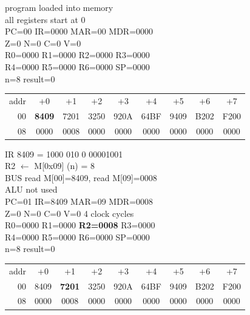 \noindent\begin{tcolorbox}[stepbox, title={Step 0 \hfill starting state}]
\textcolor{dim}{program loaded into memory}\\
\textcolor{dim}{all registers start at 0}\\
PC=00 IR=0000 MAR=00 MDR=0000\\
Z=0 N=0 C=0 V=0\\
R0=0000 R1=0000 R2=0000 R3=0000\\
R4=0000 R5=0000 R6=0000 SP=0000\\
\textcolor{dim}{n=8  result=0}\\[1pt]
{\setlength{\tabcolsep}{1.6pt}\begin{tabular}{@{}r*{8}{c}@{}}
\textcolor{dim}{addr} & \textcolor{dim}{+0} & \textcolor{dim}{+1} & \textcolor{dim}{+2} & \textcolor{dim}{+3} & \textcolor{dim}{+4} & \textcolor{dim}{+5} & \textcolor{dim}{+6} & \textcolor{dim}{+7}\\
\textcolor{dim}{00} & \cellcolor{pcc}\textbf{8409} & 7201 & 3250 & 920A & 64BF & 9409 & B202 & F200\\
\textcolor{dim}{08} & 0000 & \cellcolor{datac}0008 & \cellcolor{datac}0000 & 0000 & 0000 & 0000 & 0000 & 0000\\
\end{tabular}}
\end{tcolorbox}\hfill\begin{tcolorbox}[stepbox, title={Step 1 \hfill PC 00 \quad LD R2, n}]
\textcolor{dim}{IR} 8409 = 1000 010 0 00001001\\
R2 $\leftarrow$ M[0x09] (n) = 8\\
\textcolor{dim}{BUS} read M[00]=8409, read M[09]=0008\\
\textcolor{dim}{ALU} \textcolor{dim}{not used}\\
PC=01 IR=8409 MAR=09 MDR=0008\\
Z=0 N=0 C=0 V=0 \hfill \textcolor{dim}{4 clock cycles}\\
R0=0000 R1=0000 \textcolor{wrt}{\textbf{R2=0008}} R3=0000\\
R4=0000 R5=0000 R6=0000 SP=0000\\
\textcolor{dim}{n=8  result=0}\\[1pt]
{\setlength{\tabcolsep}{1.6pt}\begin{tabular}{@{}r*{8}{c}@{}}
\textcolor{dim}{addr} & \textcolor{dim}{+0} & \textcolor{dim}{+1} & \textcolor{dim}{+2} & \textcolor{dim}{+3} & \textcolor{dim}{+4} & \textcolor{dim}{+5} & \textcolor{dim}{+6} & \textcolor{dim}{+7}\\
\textcolor{dim}{00} & 8409 & \cellcolor{pcc}\textbf{7201} & 3250 & 920A & 64BF & 9409 & B202 & F200\\
\textcolor{dim}{08} & 0000 & \cellcolor{datac}0008 & \cellcolor{datac}0000 & 0000 & 0000 & 0000 & 0000 & 0000\\
\end{tabular}}
\end{tcolorbox}\par\vspace{3pt}
